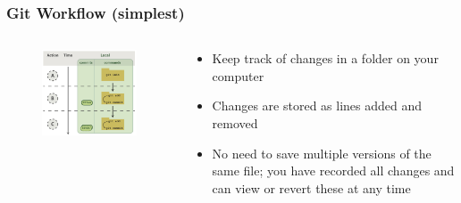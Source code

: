 \documentclass{beamer}
\begin{document}
\begin{frame}
\frametitle{Git Workflow (simplest)}

\begin{columns}
	\begin{column}{0.618\linewidth}
		\begin{figure}
			\includegraphics[width=\linewidth]{images/local-workflow}
		\end{figure}
	\end{column}
	\begin{column}{0.382\linewidth}
		\begin{itemize}
			\item<1-> Keep track of changes in a folder on your computer
			\item<2-> Changes are stored as lines added and removed
			\item<3-> No need to save multiple versions of the same file; you have recorded all changes and can view or revert these at any time
		\end{itemize}
	\end{column}
\end{columns}


\end{frame}
\end{document}

